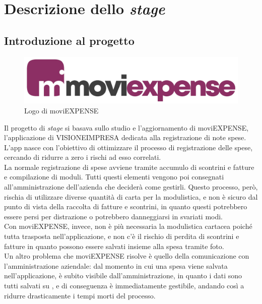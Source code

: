 \chapter{Descrizione dello \textit{stage}}
\label{cap:descrizione-stage}


\section{Introduzione al progetto}

\begin{figure}[!h]
    \centering 
    \includegraphics[width=0.5\columnwidth]{images/moviExpense_logo.png} 
    \caption{Logo di moviEXPENSE}
\end{figure}

\noindent Il progetto di \textit{stage} si basava sullo studio e l'aggiornamento di moviEXPENSE, l'applicazione di VISIONEIMPRESA dedicata alla registrazione di note spese. L'app nasce con l'obiettivo di ottimizzare il processo di registrazione delle spese, cercando di ridurre a zero i rischi ad esso correlati.\\
La normale registrazione di spese avviene tramite accumulo di scontrini e fatture e compilazione di moduli. Tutti questi elementi vengono poi consegnati all'amministrazione dell'azienda che deciderà come gestirli. Questo processo, però, rischia di utilizzare diverse quantità di carta per la modulistica, e non è sicuro dal punto di vista della raccolta di fatture e scontrini, in quanto questi potrebbero essere persi per distrazione o potrebbero danneggiarsi in svariati modi.\\
Con moviEXPENSE, invece, non è più necessaria la modulistica cartacea poiché tutta trasposta nell'applicazione, e non c'è il rischio di perdita di scontrini e fatture in quanto possono essere salvati insieme alla spesa tramite foto.\\
Un altro problema che moviEXPENSE risolve è quello della comunicazione con l'amministrazione aziendale: dal momento in cui una spesa viene salvata nell'applicazione, è subito visibile dall'amministrazione, in quanto i dati sono tutti salvati su \textit{}, e di conseguenza è immediatamente gestibile, andando così a ridurre drasticamente i tempi morti del processo.

